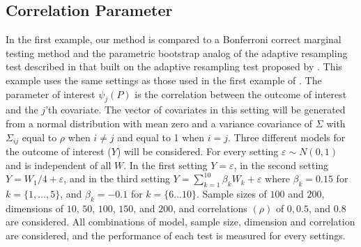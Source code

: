 \documentclass{article}
\begin{document}
\subsection{Correlation Parameter}
In the first example, our method is compared to a Bonferroni correct marginal testing method and the parametric bootstrap analog of the adaptive resampling test described in \citep{zhang_comment_2015} that built on the adaptive resampling test proposed by \citep{mckeague_adaptive_2015}.  This example uses the same settings as those used in the first example of \citep{mckeague_adaptive_2015}.  The parameter of interest $\psi_j(P)$ is the correlation between the outcome of interest and the $j$'th covariate. The vector of covariates in this setting will be generated from a normal distribution with mean zero and a variance covariance of $\Sigma$ with $\Sigma_{ij}$ equal to $\rho$ when $i \neq j$ and equal to 1 when $i = j$. Three different models for the outcome of interest ($Y$) will be considered. For every setting $\varepsilon \sim N(0, 1)$ and is independent of all $W$. In the first setting $Y = \varepsilon$, in the second setting $Y = W_1 / 4 + \varepsilon$, and in the third setting $Y = \sum_{k = 1}^{10} \beta_k W_k + \varepsilon$ where $\beta_k = 0.15$ for $k = \{1, \dots, 5\}$, and $\beta_k = -0.1$ for $k = \{6 \dots 10\}$.  Sample sizes of $100$ and $200$, dimensions of $10$, $50$, $100$, $150$, and $200$, and correlations $(\rho)$ of  $0, 0.5$, and $0.8$ are considered.  All combinations of model, sample size, dimension and correlation are considered, and the performance of each test is measured for every settings.
\end{document}
